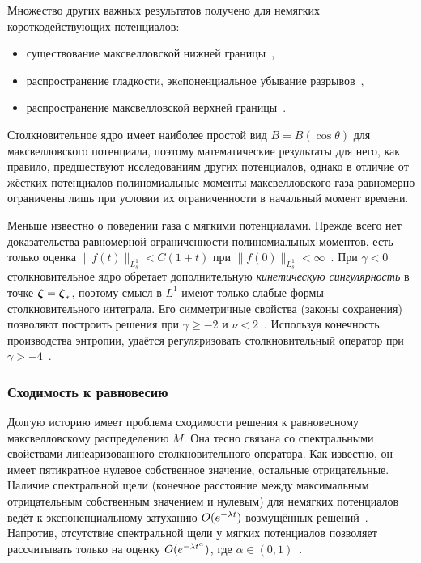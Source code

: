 Множество других важных результатов получено для немягких короткодействующих потенциалов:
\begin{itemize}
    \item существование максвелловской нижней границы~\cite{Pulvirenti1996, Pulvirenti1997},
    \item распространение гладкости, экcпоненциальное убывание разрывов~\cite{Carlen1999, Mouhot2004},
    \item распространение максвелловской верхней границы~\cite{Gamba2009upper, Bobylev2017}.
\end{itemize}
Столкновительное ядро имеет наиболее простой вид \(B = B(\cos\theta)\) для максвелловского потенциала,
поэтому математические результаты для него, как правило, предшествуют исследованиям других потенциалов,
однако в отличие от жёстких потенциалов полиномиальные моменты максвелловского газа равномерно ограничены лишь
при условии их ограниченности в начальный момент времени.

Меньше известно о поведении газа с мягкими потенциалами.
Прежде всего нет доказательства равномерной ограниченности полиномиальных моментов,
есть только оценка \(\|f(t)\|_{L^1_s} < C(1+t)\) при \(\|f(0)\|_{L^1_s} < \infty\)~\cite{Carlen2009}.
При \(\gamma<0\) столкновительное ядро обретает дополнительную \emph{кинетическую сингулярность} в точке \({\boldsymbol{\zeta}} = {\boldsymbol{\zeta}}_*\),
поэтому смысл в \(L^1\) имеют только слабые формы столкновительного интеграла.
Его симметричные свойства (законы сохранения) позволяют построить решения при \(\gamma\geq-2\) и \(\nu<2\)~\cite{Arkeryd1981, Goudon1997}.
Используя конечность производства энтропии, удаётся регуляризовать столкновительный оператор при \(\gamma>-4\)~\cite{Villani1998}.

\subsubsection{Сходимость к равновесию}

Долгую историю имеет проблема сходимости решения к равновесному максвелловскому распределению \(M\).
Она тесно связана со спектральными свойствами линеаризованного столкновительного оператора.
Как известно, он имеет пятикратное нулевое собственное значение, остальные отрицательные.
Наличие спектральной щели (конечное расстояние между максимальным отрицательным собственным значением и нулевым)
для немягких потенциалов ведёт к экспоненциальному затуханию \(O(e^{-\lambda t})\) возмущённых решений~\cite{Grad1963b}.
Напротив, отсутствие спектральной щели у мягких потенциалов позволяет рассчитывать только на оценку \(O(e^{-\lambda t^\alpha})\),
где \(\alpha\in(0,1)\)~\cite{Caflisch1980a}.

